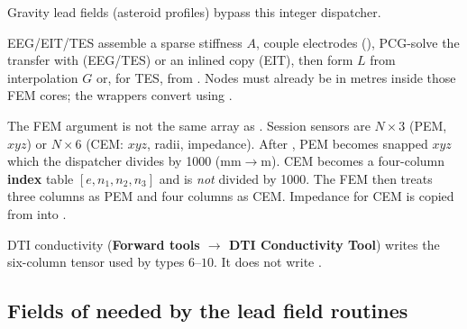 Gravity lead fields (asteroid profiles) bypass this integer dispatcher.

EEG/EIT/TES assemble a sparse stiffness \(A\), couple electrodes
(), PCG-solve the transfer with
 (EEG/TES) or an inlined copy (EIT), then
form \(L\) from interpolation \(G\) or, for TES, from
. Nodes must already be in metres inside
those FEM cores; the wrappers convert using .

The FEM  argument is not the same array as
. Session sensors are \(N\times 3\) (PEM, \(xyz\)) or
\(N\times 6\) (CEM: \(xyz\), radii, impedance). After
, PEM becomes snapped \(xyz\) which the
dispatcher divides by 1000 (mm\(\to\)m). CEM becomes a four-column
\textbf{index} table \([e, n_1, n_2, n_3]\) and is \emph{not} divided by
1000. The FEM then treats three columns as PEM and four columns as CEM.
Impedance for CEM is copied from  into
.

DTI conductivity (\textbf{Forward tools \(\to\) DTI Conductivity Tool})
writes the six-column tensor used by types \(6\)--\(10\). It does not write
.

\subsection{Fields of  needed by the lead field routines}%
\label{ssec:leadfield-fields}






